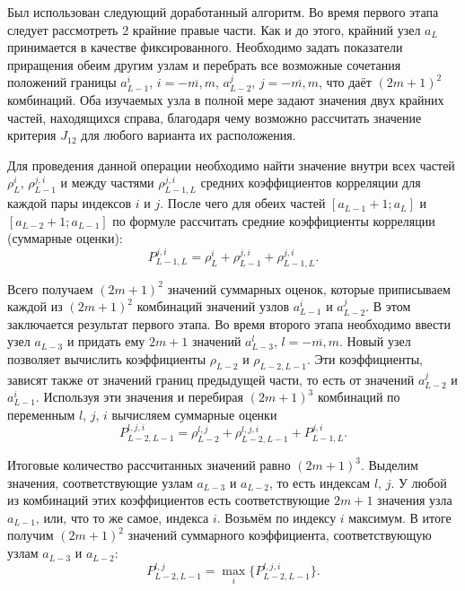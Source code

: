 Был использован следующий доработанный алгоритм.
Во время первого этапа следует рассмотреть 2 крайние правые части.
Как и до этого, крайний узел $a_L$ принимается в качестве фиксированного.
Необходимо задать показатели приращения обеим другим узлам и перебрать все возможные сочетания положений границы $a_{L-1}^i$, $i = \overline{-m, m}$, $a_{L-2}^j$, $j = \overline{-m, m}$, что даёт $(2m + 1)^2$ комбинаций.
Оба изучаемых узла в полной мере задают значения двух крайних частей, находящихся справа, благодаря чему возможно рассчитать значение критерия $J_{12}$ для любого варианта их расположения.

Для проведения данной операции необходимо найти значение внутри всех частей $\rho_L^i$, $\rho_{L-1}^{j, i}$ и между частями $\rho_{L-1, L}^{j, i}$ средних коэффициентов корреляции для каждой пары индексов $i$ и $j$.
После чего для обеих частей $[a_{L-1} + 1; a_L]$ и $[a_{L-2} + 1; a_{L-1}]$ по формуле рассчитать средние коэффициенты корреляции (суммарные оценки):
\begin{equation}
P_{L-1, L}^{j, i} = \rho_L^i + \rho_{L-1}^{j, i} + \rho_{L-1, L}^{j, i}.
\end{equation}

Всего получаем $(2m + 1)^2$ значений суммарных оценок, которые приписываем каждой из $(2m + 1)^2$ комбинаций значений узлов $a_{L-1}^i$ и $a_{L-2}^j$.
В этом заключается результат первого этапа.
Во время второго этапа необходимо ввести узел $a_{L-3}$ и придать ему $2m + 1$ значений $a_{L-3}^l$, $l = \overline{-m, m}$.
Новый узел позволяет вычислить коэффициенты $\rho_{L-2}$ и $\rho_{L-2, L-1}$.
Эти коэффициенты, зависят также от значений границ предыдущей части, то есть от значений $a_{L-2}^j$ и $a_{L-1}^i$.
Используя эти значения и перебирая $(2m + 1)^3$ комбинаций по переменным $l$, $j$, $i$ вычисляем суммарные оценки
\begin{equation}
P_{L-2, L-1}^{l, j, i} = \rho_{L-2}^{l, j} + \rho_{L-2, L-1}^{l, j, i} + P_{L-1, L}^{j, i}.
\end{equation}

Итоговые количество рассчитанных значений равно $(2m + 1)^3$.
Выделим значения, соответствующие узлам $a_{L-3}$ и $a_{L-2}$, то есть индексам $l$, $j$.
У любой из комбинаций этих коэффициентов есть соответствующие $2m + 1$ значения узла $a_{L-1}$, или, что то же самое, индекса $i$.
Возьмём по индексу $i$ максимум.
В итоге получим $(2m + 1)^2$ значений суммарного коэффициента, соответствующую узлам $a_{L-3}$ и $a_{L-2}$:
\begin{equation}
P_{L-2, L-1}^{l, j} = \max_{i} \{ P_{L-2, L-1}^{l, j, i} \}.
\end{equation}

